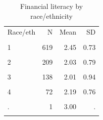 \begin{table}[htbp]\centering\small
\caption{Financial literacy by race/ethnicity}
\label{tab:finlit_by_race_eth}
\begin{tabular}{lrrr}\toprule
Race/eth & N & Mean & SD \\\\ \midrule
1 & 619 & 2.45 & 0.73 \\\\
2 & 209 & 2.03 & 0.79 \\\\
3 & 138 & 2.01 & 0.94 \\\\
4 & 72 & 2.19 & 0.76 \\\\
. & 1 & 3.00 & . \\\\
\bottomrule
\end{tabular}\end{table}
